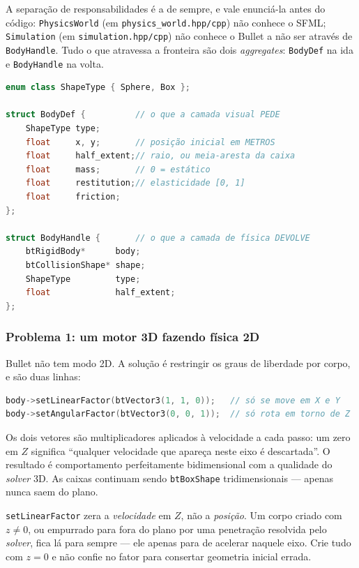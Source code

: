 A separação de responsabilidades é a de sempre, e vale enunciá-la antes do
código: \texttt{PhysicsWorld} (em \texttt{physics\_world.hpp/cpp}) não conhece o
SFML; \texttt{Simulation} (em \texttt{simulation.hpp/cpp}) não conhece o Bullet
a não ser através de \texttt{BodyHandle}. Tudo o que atravessa a fronteira são
dois \emph{aggregates}: \texttt{BodyDef} na ida e \texttt{BodyHandle} na volta.

\begin{lstlisting}[style=bt, language=C++,
    caption={Os dois tipos de vocabulário da fronteira --- \texttt{src/sfml\_bullet/physics\_world.hpp}.}]
enum class ShapeType { Sphere, Box };

struct BodyDef {          // o que a camada visual PEDE
    ShapeType type;
    float     x, y;       // posição inicial em METROS
    float     half_extent;// raio, ou meia-aresta da caixa
    float     mass;       // 0 = estático
    float     restitution;// elasticidade [0, 1]
    float     friction;
};

struct BodyHandle {       // o que a camada de física DEVOLVE
    btRigidBody*      body;
    btCollisionShape* shape;
    ShapeType         type;
    float             half_extent;
};
\end{lstlisting}

\subsubsection{Problema 1: um motor 3D fazendo física 2D}

Bullet não tem modo 2D. A solução é restringir os graus de liberdade por corpo,
e são duas linhas:

\begin{lstlisting}[style=bt, language=C++,
    caption={O detalhe mais importante do subprojeto.}]
body->setLinearFactor(btVector3(1, 1, 0));   // só se move em X e Y
body->setAngularFactor(btVector3(0, 0, 1));  // só rota em torno de Z
\end{lstlisting}

Os dois vetores são multiplicadores aplicados à velocidade a cada passo:
um zero em $Z$ significa ``qualquer velocidade que apareça neste eixo é
descartada''. O resultado é comportamento perfeitamente bidimensional com a
qualidade do \emph{solver} 3D. As caixas continuam sendo \texttt{btBoxShape}
tridimensionais --- apenas nunca saem do plano.

\begin{armadilha}
\texttt{setLinearFactor} zera a \emph{velocidade} em $Z$, não a \emph{posição}.
Um corpo criado com $z \neq 0$, ou empurrado para fora do plano por uma
penetração resolvida pelo \emph{solver}, fica lá para sempre --- ele apenas
para de acelerar naquele eixo. Crie tudo com $z = 0$ e não confie no fator para
consertar geometria inicial errada.
\end{armadilha}


